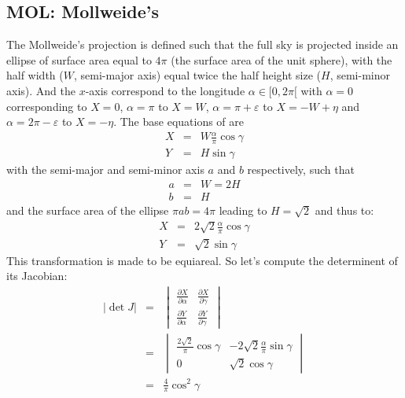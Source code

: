 \subsection{MOL: Mollweide's}

  The Mollweide's projection is defined such that the full sky is projected
  inside an ellipse of surface area equal to $4\pi$ (the surface area of the
  unit sphere), with the half width ($W$, semi-major axis) equal twice the
  half height size ($H$, semi-minor axis).
  And the $x$-axis correspond to the longitude $\alpha \in [0, 2\pi[$ with
  $\alpha = 0$ corresponding to $X = 0$, $\alpha=\pi$ to $X=W$,
  $\alpha=\pi+\varepsilon$ to $X=-W+\eta$ and $\alpha=2\pi-\varepsilon$ to $X=-\eta$.
  The base equations of are 
  \begin{eqnarray*}
    X & = & W \frac{\alpha}{\pi} \cos\gamma \\
    Y & = & H                    \sin\gamma
  \end{eqnarray*}
  with the semi-major and semi-minor axis $a$ and $b$ respectively, such that
  \begin{eqnarray*}
    a & = & W = 2H \\
    b & = & H
  \end{eqnarray*}
  and the surface area of the ellipse $\pi a b = 4\pi$ leading to $H=\sqrt{2}$
  and thus to:
  \begin{eqnarray}
    X & = & 2\sqrt{2} \frac{\alpha}{\pi} \cos\gamma \\
    Y & = &  \sqrt{2}                    \sin\gamma
  \end{eqnarray}
  This transformation is made to be equiareal.
  So let's compute the determinent of its Jacobian:
  \begin{eqnarray*}
    |\det J| & = & \begin{vmatrix}
                     \frac{\partial X}{\partial \alpha} & \frac{\partial X}{\partial \gamma} \\
                     \frac{\partial Y}{\partial \alpha} & \frac{\partial Y}{\partial \gamma}
                   \end{vmatrix} \\
             & = & \begin{vmatrix}
                     \frac{2\sqrt{2}}{\pi} \cos\gamma & -2\sqrt{2} \frac{\alpha}{\pi} \sin\gamma \\
                                                    0 & \sqrt{2}\cos\gamma
                   \end{vmatrix} \\
             & = & \frac{4}{\pi}\cos^2\gamma
  \end{eqnarray*}
